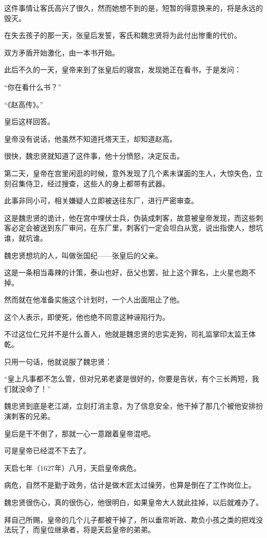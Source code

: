 \begin{multicols}{\theparacolNo}
这件事情让客氏高兴了很久，然而她想不到的是，短暂的得意换来的，将是永远的毁灭。

在失去孩子的那一天，张皇后发誓，客氏和魏忠贤将为此付出惨重的代价。

双方矛盾开始激化，由一本书开始。

此后不久的一天，皇帝来到了张皇后的寝宫，发现她正在看书，于是发问：

“你在看什么书？”

“《赵高传》。”

皇后这样回答。

皇帝没有说话，他虽然不知道托塔天王，却知道赵高。

很快，魏忠贤就知道了这件事，他十分愤怒，决定反击。

第二天，皇帝在宫里闲逛的时候，意外发现了几个素未谋面的生人，大惊失色，立刻召集侍卫，经过搜查，这些人的身上都带有武器。

此事非同小可，相关嫌疑人立即被送往东厂，进行严密审查。

这是魏忠贤的诡计，他在宫中埋伏士兵，伪装成刺客，故意被皇帝发现，而这些刺客必定会被送到东厂审问，在东厂里，刺客们一定会坦白从宽，说出指使人，想坑谁，就坑谁。

魏忠贤想坑的人，叫做张国纪——张皇后的父亲。

这是一条相当毒辣的计策，泰山也好，岳父也罢，扯上这个罪名，上火星也跑不掉。

然而就在他准备实施这个计划时，一个人出面阻止了他。

这个人表示，即使死，他也绝不同意这种诬陷行为。

不过这位仁兄并不是什么善人，他就是魏忠贤的忠实走狗，司礼监掌印太监王体乾。

只用一句话，他就说服了魏忠贤：

“皇上凡事都不怎么管，但对兄弟老婆是很好的，你要是告状，有个三长两短，我们就没命了！”

魏忠贤到底是老江湖，立刻打消主意，为了信息安全，他干掉了那几个被他安排扮演刺客的兄弟。

皇后是干不倒了，那就一心一意跟着皇帝混吧。

可是皇帝已经混不下去了。

天启七年（1627年）八月，天启皇帝病危。

病危，自然不是勤于政务，估计是做木匠太过操劳，也算是倒在了工作岗位上。

魏忠贤很伤心，真的很伤心，他很明白，如果皇帝大人就此挂掉，以后就难办了。

拜自己所赐，皇帝的几个儿子都被干掉了，所以垂帘听政、欺负小孩之类的把戏没法玩了，而皇位继承者，将是天启皇帝的弟弟。


\end{multicols}
